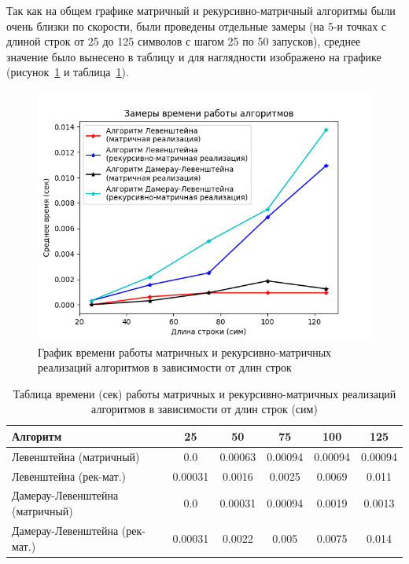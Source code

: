 \hspace{1.25cm}
Так как на общем графике матричный и рекурсивно-матричный алгоритмы были очень близки по скорости, были проведены отдельные замеры (на 5-и точках с длиной строк от 25 до 125 символов с шагом 25 по 50 запусков), среднее значение было вынесено в таблицу и для наглядности изображено на графике (рисунок~\ref{fig:graph_mat_rec-mat} и таблица~\ref{table:table_mat_rec-mat}).

\begin{figure}[H]
    \centering
    \includegraphics[width=1\textwidth]{img/graph_mat_rec-mat.png}
    \caption{График времени работы матричных и рекурсивно-матричных реализаций алгоритмов в зависимости от длин строк}
    \label{fig:graph_mat_rec-mat}
\end{figure}

\begin{table}[H]
    \centering
    \begin{tabular}{|l|c|c|c|c|c|}
        \hline
        \textbf{Алгоритм} & \textbf{25} & \textbf{50} & \textbf{75} & \textbf{100} & \textbf{125}\\
        \hline
        Левенштейна (матричный) & 0.0 & 0.00063 & 0.00094 & 0.00094 & 0.00094 \\
        Левенштейна (рек-мат.) & 0.00031 & 0.0016 & 0.0025 & 0.0069 & 0.011 \\
        Дамерау-Левенштейна (матричный) & 0.0 & 0.00031 & 0.00094 & 0.0019 & 0.0013 \\
        Дамерау-Левенштейна (рек-мат.) & 0.00031 & 0.0022 & 0.005 & 0.0075 & 0.014 \\
        \hline
    \end{tabular}
    \caption{Таблица времени (сек) работы матричных и рекурсивно-матричных реализаций алгоритмов в зависимости от длин строк (сим)}
    \label{table:table_mat_rec-mat}
\end{table}

